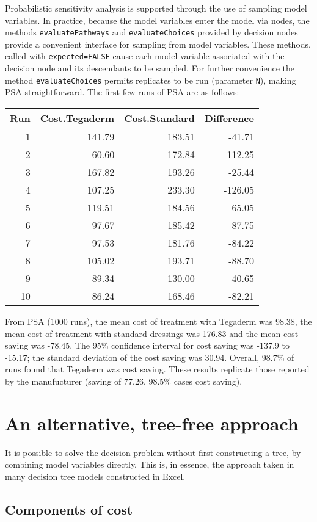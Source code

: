 \documentclass[]{article}
\begin{document}
Probabilistic sensitivity analysis is supported through the use of
sampling model variables. In practice, because the model variables enter
the model via nodes, the methods \texttt{evaluatePathways} and
\texttt{evaluateChoices} provided by decision nodes provide a convenient
interface for sampling from model variables. These methods, called with
\texttt{expected=FALSE} cause each model variable associated with the
decision node and its descendants to be sampled. For further convenience
the method \texttt{evaluateChoices} permits replicates to be run
(parameter \texttt{N}), making PSA straightforward. The first few runs
of PSA are as follows:

\begin{longtable}[]{@{}rrrr@{}}
\toprule
Run & Cost.Tegaderm & Cost.Standard & Difference\tabularnewline
\midrule
\endhead
1 & 141.79 & 183.51 & -41.71\tabularnewline
2 & 60.60 & 172.84 & -112.25\tabularnewline
3 & 167.82 & 193.26 & -25.44\tabularnewline
4 & 107.25 & 233.30 & -126.05\tabularnewline
5 & 119.51 & 184.56 & -65.05\tabularnewline
6 & 97.67 & 185.42 & -87.75\tabularnewline
7 & 97.53 & 181.76 & -84.22\tabularnewline
8 & 105.02 & 193.71 & -88.70\tabularnewline
9 & 89.34 & 130.00 & -40.65\tabularnewline
10 & 86.24 & 168.46 & -82.21\tabularnewline
\bottomrule
\end{longtable}

From PSA (1000 runs), the mean cost of treatment with Tegaderm was
98.38, the mean cost of treatment with standard dressings was 176.83 and
the mean cost saving was -78.45. The 95\% confidence interval for cost
saving was -137.9 to -15.17; the standard deviation of the cost saving
was 30.94. Overall, 98.7\% of runs found that Tegaderm was cost saving.
These results replicate those reported by the manufucturer (saving of
77.26, 98.5\% cases cost saving).

\hypertarget{an-alternative-tree-free-approach}{%
\section{An alternative, tree-free
approach}\label{an-alternative-tree-free-approach}}

It is possible to solve the decision problem without first constructing
a tree, by combining model variables directly. This is, in essence, the
approach taken in many decision tree models constructed in Excel.

\hypertarget{components-of-cost}{%
\subsection{Components of cost}\label{components-of-cost}}
\end{document}

